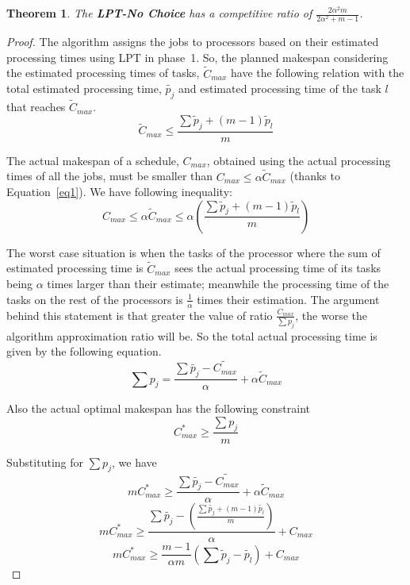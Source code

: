 \documentclass[10pt, conference, compsocconf]{IEEEtran}
\newtheorem{theorem}{Theorem}
\begin{document}
\begin{theorem}
\label{th:strat1-ub}
The \textbf{LPT-No Choice} has a competitive ratio of $ \frac{2\alpha^{2}m}{2\alpha^{2}+ m-1}$.
\end{theorem} 

\begin{proof}
  The algorithm assigns the jobs to processors based on their
  estimated processing times using LPT in phase~1. So, the
  planned makespan considering the estimated processing times of tasks,
  $\tilde{C}_{max}$ have the following relation with the total
  estimated processing time, $\tilde{p_j}$ and estimated processing
  time of the task  $l$ that reaches $\tilde{C}_{max}$.
\begin{equation}\label{eq2}
\tilde C_{max}\leq  \frac{\sum{\tilde p_j + (m-1) \tilde p_l} }{m}
\end{equation}

The actual makespan of a schedule, $C_{max}$, obtained using the
actual processing times of all the jobs, must be smaller than $C_{max} \leq \alpha
\tilde C_{max}$ (thanks to Equation~\ref{eq1}). We
have following inequality:
\begin{equation}\label{eq3}
  C_{max}\leq \alpha \tilde C_{max}\leq \alpha \left ( \frac{\sum{\tilde p_j + (m-1) \tilde p_l} }{m} \right )
\end{equation} 

The worst case situation is when the tasks of the processor where the
sum of estimated processing time is $\tilde C_{max}$ sees the actual
processing time of its tasks being $\alpha$ times larger than their
estimate; meanwhile the processing time of the tasks on the rest of the
processors is $\frac{1}{\alpha}$ times their estimation. The argument
behind this statement is that greater the value of ratio
$\frac{C_{max}}{\sum{p_j}}$, the worse the algorithm approximation
ratio will be. So the total actual processing time is
given by the following equation.
 \begin{equation}\label{eq4}
 \sum {p_j} = \frac{\sum \tilde{p_j}- \tilde{C_{max}}}{\alpha} + \alpha \tilde C_{max}
 \end{equation}
 
 Also the actual optimal makespan has the following constraint
 \begin{equation}\nonumber 
C_{max}^{*}\geq \frac{\sum {p_j}}{m}
\end{equation}

Substituting for  $ \sum {p_j}$, we have
 \begin{equation}\nonumber 
 m C_{max}^{*}\geq \frac{\sum \tilde{p_j}- \tilde{C_{max}}}{\alpha} + \alpha \tilde C_{max}
 \end{equation} 
\begin{equation}\nonumber 
 m C_{max}^{*}\geq \frac{\sum \tilde{p_j} - \left( \frac{\sum{\tilde{p_j} + (m-1) \tilde{p_l} }}{m} \right )} {\alpha} + {C_{max}}
\end{equation}
\begin{equation}\nonumber
 m C_{max}^{*}\geq \frac{m-1}{\alpha m} \left( \sum \tilde p_j - \tilde{p_l} \right) + {C_{max}}
 \end{equation}


\end{proof}
\end{document}

